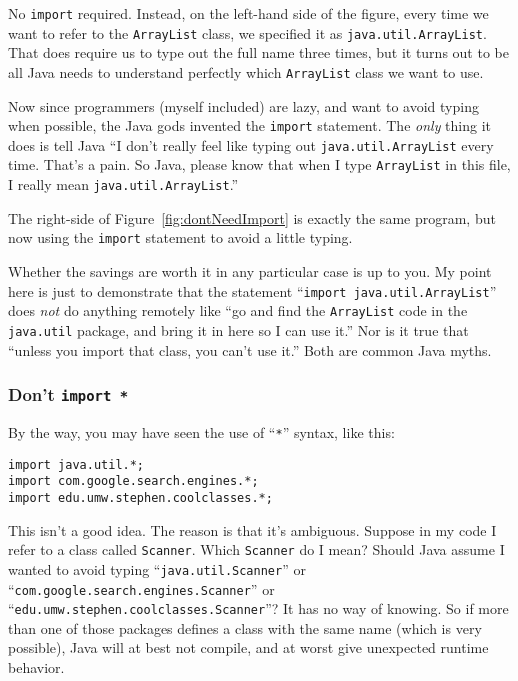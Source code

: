 No \texttt{import} required. Instead, on the left-hand side of the figure,
every time we want to refer to the \texttt{ArrayList} class, we specified it
as \texttt{java.util.ArrayList}. That does require us to type out the full
name three times, but it turns out to be all Java needs to understand
perfectly which \texttt{ArrayList} class we want to use.

Now since programmers (myself included) are lazy, and want to avoid typing
when possible, the Java gods invented the \texttt{import} statement. The
\textit{only} thing it does is tell Java ``I don't really feel like typing out
\texttt{java.util.ArrayList} every time. That's a pain. So Java, please know
that when I type \texttt{ArrayList} in this file, I really mean
\texttt{java.util.ArrayList}.''

The right-side of Figure~\ref{fig:dontNeedImport} is exactly the same program,
but now using the \texttt{import} statement to avoid a little typing.

Whether the savings are worth it in any particular case is up to you. My point
here is just to demonstrate that the statement ``\texttt{import
java.util.ArrayList}'' does \textit{not} do anything remotely like ``go and
find the \texttt{ArrayList} code in the \texttt{java.util} package, and bring
it in here so I can use it.'' Nor is it true that ``unless you import that
class, you can't use it.'' Both are common Java myths.

\subsubsection{Don't \texttt{import *}}

By the way, you may have seen the use of ``\texttt{*}'' syntax, like this:

\begin{Verbatim}[fontsize=\small,samepage=true]
import java.util.*;
import com.google.search.engines.*;
import edu.umw.stephen.coolclasses.*;
\end{Verbatim}

This isn't a good idea. The reason is that it's ambiguous. Suppose in my code
I refer to a class called \texttt{Scanner}. Which \texttt{Scanner} do I mean?
Should Java assume I wanted to avoid typing ``\texttt{java.util.Scanner}'' or
``\texttt{com.google.search.engines.Scanner}'' or
``\texttt{edu.umw.stephen.coolclasses.Scanner}''? It has no way of knowing. So
if more than one of those packages defines a class with the same name (which
is very possible), Java will at best not compile, and at worst give unexpected
runtime behavior.

